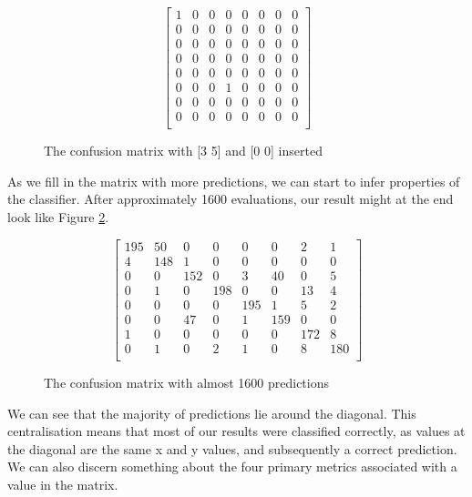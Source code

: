 \begin{figure}[h]
    \myfontsize
    \centering
    \[
    \begin{bmatrix}
     1 & 0 &  0 &  0 &  0 &  0 &  0 &  0\\
     0 & 0 &  0 &  0 &  0 &  0 &  0 &  0\\
     0 & 0 &  0 &  0 &  0 &  0 &  0 &  0\\
     0 & 0 &  0 &  0 &  0 &  0 &  0 &  0\\
     0 & 0 &  0 &  0 &  0 &  0 &  0 &  0\\
     0 & 0 &  0 &  1 &  0 &  0 &  0 &  0\\
     0 & 0 &  0 &  0 &  0 &  0 &  0 &  0\\
     0 & 0 &  0 &  0 &  0 &  0 &  0 &  0\\
    \end{bmatrix}
    \]
    \caption{The confusion matrix with [3 5] and [0 0] inserted }
    \label{mat:nonemptyCM}
\end{figure}

As we fill in the matrix with more predictions, we can start to infer properties of the classifier. After approximately 1600 evaluations, our result might at the end look like Figure \ref{mat:FullCM}.
\begin{figure}[h]
    \myfontsize
    \centering
    \[
    \begin{bmatrix}
     195 & 50 &  0 &  0 &  0 &  0 &  2  & 1\\
       4 & 148&  1 &  0 &  0 &  0 &  0  & 0\\
       0 &  0 & 152&  0 &  3 & 40 &  0  & 5\\
       0 &  1 &  0 &198 &  0 &  0 & 13  & 4\\
       0 &  0 &  0 & 0  &195 &  1 &  5  & 2\\
       0 &  0 & 47 & 0  &  1 &159 &  0  & 0\\
       1 &  0 &  0 & 0  &  0 &  0 & 172 &  8\\
       0 &  1 &  0 & 2  &  1 &  0 &  8  & 180\\
    \end{bmatrix}
    \]
    \caption{The confusion matrix with  almost 1600 predictions}
    \label{mat:FullCM}
\end{figure}
We can see that the majority of predictions lie around the diagonal. This centralisation means that most of our results were classified correctly, as values at the diagonal are the same x and y values, and subsequently a correct prediction. 
We can also discern something about the four primary metrics associated with a value in the matrix.\\

